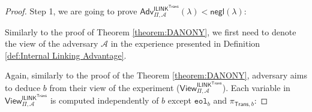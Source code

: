\begin{proof}
    Step 1, we are going to prove $\mathsf{Adv}^{\mathsf{ILINK}^\textsf{Trans}}_{\Pi, \mathcal{A}}(\lambda) < \mathsf{negl}(\lambda)$:
    
    Similarly to the proof of Theorem \ref{theorem:DANONY}, we first need to denote the view of the adversary $\mathcal{A}$ in the experience presented in Definition \ref{def:Internal Linking Advantage}.

\begin{figure}[!h]
\end{figure}



Again, similarly to the proof of  the Theorem \ref{theorem:DANONY}, adversary aims to deduce $b$ from their view of the experiment ($\mathsf{View}^{\mathsf{ILINK}^\mathsf{Trans}}_{\Pi, \mathcal{A}}$). Each variable in $\mathsf{View}^{\mathsf{ILINK}^\mathsf{Trans}}_{\Pi, \mathcal{A}}$ is computed independently of  $b$ except $\texttt{eol}_{b}$ and $\pi_{\mathsf{Trans}, b}$:


\end{proof}
